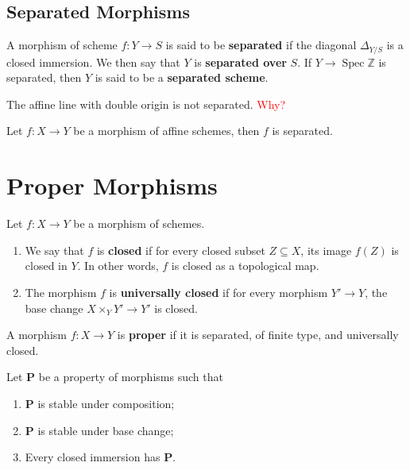 \documentclass[12pt]{book}
\newcommand{\inlinedef}[1]{\textcolor{oxfordblue}{\bfseries #1}}
\theoremstyle{definition}
\newcommand{\ZZ}{\mathbb Z}
\DeclareMathOperator{\Spec}{Spec}
\newcommand{\todo}[1]{\textcolor{red}{#1}}
\begin{document}
	\section{Separated Morphisms}
	
	\begin{definition}
		A morphism of scheme $f \colon Y \to S$ is said to be \inlinedef{separated} if the diagonal $\Delta_{Y/S}$ is a closed immersion. We then say that $Y$ is \inlinedef{separated over} $S$. If $Y \to \Spec \ZZ$ is separated, then $Y$ is said to be a \inlinedef{separated scheme}.
	\end{definition}
	
	\begin{example}
		The affine line with double origin is not separated. \todo{Why?}
	\end{example}
	
	\begin{proposition}
		Let $f \colon X \to Y$ be a morphism of affine schemes, then $f$ is separated.
	\end{proposition}
	
	\chapter{Proper Morphisms}
	
	\begin{definition}
		Let $f \colon X \to Y$ be a morphism of schemes.
		
		\begin{enumerate}
			\item We say that $f$ is \inlinedef{closed} if for every closed subset $Z \subseteq X$, its image $f(Z)$ is closed in $Y$. In other words, $f$ is closed as a topological map.
			
			\item The morphism $f$ is \inlinedef{universally closed} if for every morphism $Y' \to Y$, the base change $X \times_Y Y' \to Y'$ is closed.
		\end{enumerate}
	\end{definition}
	
	\begin{definition}
		A morphism $f \colon X \to Y$ is \inlinedef{proper} if it is separated, of finite type, and universally closed.
	\end{definition}
	
	\begin{lemma}
		Let $\mathbf{P}$ be a property of morphisms such that
		\begin{enumerate}
			\item $\mathbf{P}$ is stable under composition;
			\item $\mathbf{P}$ is stable under base change;
			\item Every closed immersion has $\mathbf{P}$.
		\end{enumerate}
		
	\end{lemma}
	
\end{document}

